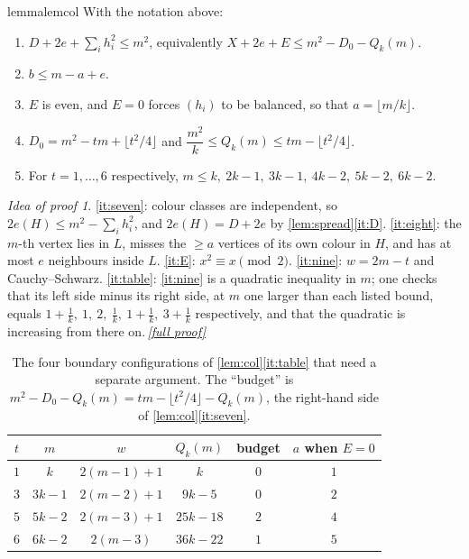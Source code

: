 \documentclass[11pt,a4paper]{article}
\theoremstyle{plain}
\theoremstyle{definition}
\theoremstyle{remark}
\newtheorem*{proofidea}{Idea of proof}
\newcommand{\fullproofref}[1]{\,\hyperref[#1]{\textit{[full proof]}}}
\providecommand{\tightlist}{\setlength{\itemsep}{0pt}\setlength{\parskip}{0pt}}
\newcommand{\fl}[1]{\lfloor #1\rfloor}
\begin{document}
\begin{restatable}{lemma}{lemcol}\label{lem:col}
With the notation above:
\begin{enumerate}[label=(\alph*)]\tightlist
\item\label{it:seven} $D+2e+\sum_i h_i^2\le m^2$, equivalently $X+2e+E\le m^2-D_0-Q_k(m)$.
\item\label{it:eight} $b\le m-a+e$.
\item\label{it:E} $E$ is even, and $E=0$ forces $(h_i)$ to be balanced, so that $a=\fl{m/k}$.
\item\label{it:nine} $D_0=m^2-tm+\fl{t^2/4}$ and $\dfrac{m^2}{k}\le Q_k(m)\le tm-\fl{t^2/4}$.
\item\label{it:table} For $t=1,\dots,6$ respectively, $m\le k,\ 2k-1,\ 3k-1,\ 4k-2,\ 5k-2,\ 6k-2$.
\end{enumerate}
\end{restatable}

\begin{proofidea}
\ref{it:seven}: colour classes are independent, so $2e(H)\le m^2-\sum_ih_i^2$, and $2e(H)=D+2e$ by \cref{lem:spread}\ref{it:D}. \ref{it:eight}: the $m$-th vertex lies in $L$, misses the $\ge a$ vertices of its own colour in $H$, and has at most $e$ neighbours inside $L$. \ref{it:E}: $x^2\equiv x\pmod 2$. \ref{it:nine}: $w=2m-t$ and Cauchy--Schwarz. \ref{it:table}: \ref{it:nine} is a quadratic inequality in $m$; one checks that its left side minus its right side, at $m$ one larger than each listed bound, equals $1+\tfrac1k,\ 1,\ 2,\ \tfrac1k,\ 1+\tfrac1k,\ 3+\tfrac1k$ respectively, and that the quadratic is increasing from there on.\fullproofref{pf:col}
\end{proofidea}

\begin{table}[ht]\centering
\caption{The four boundary configurations of \cref{lem:col}\ref{it:table} that need a separate argument. The ``budget'' is $m^2-D_0-Q_k(m)=tm-\fl{t^2/4}-Q_k(m)$, the right-hand side of \cref{lem:col}\ref{it:seven}.}\label{tab:boundary}
\begin{tabular}{@{}cccccc@{}}
\toprule
$t$ & $m$ & $w$ & $Q_k(m)$ & budget & $a$ when $E=0$\\
\midrule
$1$ & $k$    & $2(m-1)+1$ & $k$     & $0$ & $1$\\
$3$ & $3k-1$ & $2(m-2)+1$ & $9k-5$  & $0$ & $2$\\
$5$ & $5k-2$ & $2(m-3)+1$ & $25k-18$ & $2$ & $4$\\
$6$ & $6k-2$ & $2(m-3)$   & $36k-22$ & $1$ & $5$\\
\bottomrule
\end{tabular}
\end{table}
\end{document}
